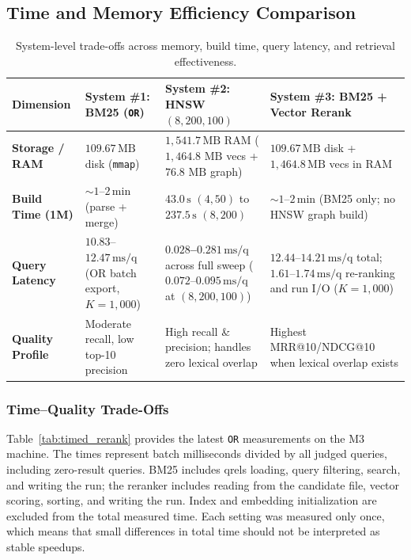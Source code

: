 \documentclass[11pt]{article}
\begin{document}
\subsection{Time and Memory Efficiency Comparison}

\begin{table}[H]
\centering
\footnotesize
\begin{tabular}{p{}p{}p{}p{}}
\toprule
\textbf{Dimension} & \textbf{System \#1: BM25 (\texttt{OR})} & \textbf{System \#2: HNSW $(8, 200, 100)$} & \textbf{System \#3: BM25 + Vector Rerank} \\
\midrule
\textbf{Storage / RAM} & $109.67\,\text{MB}$ disk (\texttt{mmap}) & $1{,}541.7\,\text{MB}$ RAM ($1{,}464.8\text{ MB}$ vecs + $76.8\text{ MB}$ graph) & $109.67\,\text{MB}$ disk + $1{,}464.8\,\text{MB}$ vecs in RAM \\
\addlinespace[3pt]
\textbf{Build Time (1M)} & $\sim 1$--$2\,\text{min}$ (parse + merge) & $43.0\,\text{s}$ $(4,50)$ to $237.5\,\text{s}$ $(8,200)$ & $\sim 1$--$2\,\text{min}$ (BM25 only; no HNSW graph build) \\
\addlinespace[3pt]
\textbf{Query Latency} & $10.83$--$12.47\,\text{ms/q}$ (OR batch export, $K=1{,}000$) & \textbf{$0.028$--$0.281\,\text{ms/q}$} across full sweep ($0.072$--$0.095\,\text{ms/q}$ at $(8,200,100)$) & $12.44$--$14.21\,\text{ms/q}$ total; $1.61$--$1.74\,\text{ms/q}$ re-ranking and run I/O ($K=1{,}000$) \\
\addlinespace[3pt]
\textbf{Quality Profile} & Moderate recall, low top-10 precision & High recall \& precision; handles zero lexical overlap & Highest MRR@10/NDCG@10 when lexical overlap exists \\
\bottomrule
\end{tabular}
\caption{System-level trade-offs across memory, build time, query latency, and retrieval effectiveness.}
\label{tab:tradeoffs}
\end{table}

\subsubsection{Time--Quality Trade-Offs}
Table~\ref{tab:timed_rerank} provides the latest \texttt{OR} measurements on the M3 machine. The times represent batch milliseconds divided by all judged queries, including zero-result queries. BM25 includes qrels loading, query filtering, search, and writing the run; the reranker includes reading from the candidate file, vector scoring, sorting, and writing the run. Index and embedding initialization are excluded from the total measured time. Each setting was measured only once, which means that small differences in total time should not be interpreted as stable speedups.
\end{document}
